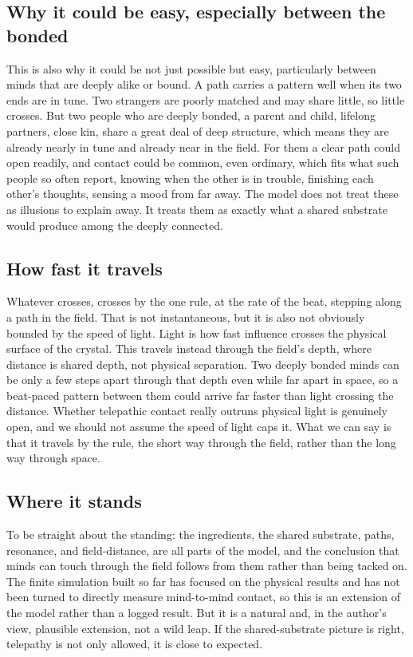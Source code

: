 \subsection{Why it could be easy, especially between the bonded}

This is also why it could be not just possible but easy, particularly between minds that are deeply alike or bound. A path carries a pattern well when its two ends are in tune. Two strangers are poorly matched and may share little, so little crosses. But two people who are deeply bonded, a parent and child, lifelong partners, close kin, share a great deal of deep structure, which means they are already nearly in tune and already near in the field. For them a clear path could open readily, and contact could be common, even ordinary, which fits what such people so often report, knowing when the other is in trouble, finishing each other's thoughts, sensing a mood from far away. The model does not treat these as illusions to explain away. It treats them as exactly what a shared substrate would produce among the deeply connected.

\subsection{How fast it travels}

Whatever crosses, crosses by the one rule, at the rate of the beat, stepping along a path in the field. That is not instantaneous, but it is also not obviously bounded by the speed of light. Light is how fast influence crosses the physical surface of the crystal. This travels instead through the field's depth, where distance is shared depth, not physical separation. Two deeply bonded minds can be only a few steps apart through that depth even while far apart in space, so a beat-paced pattern between them could arrive far faster than light crossing the distance. Whether telepathic contact really outruns physical light is genuinely open, and we should not assume the speed of light caps it. What we can say is that it travels by the rule, the short way through the field, rather than the long way through space.

\subsection{Where it stands}

To be straight about the standing: the ingredients, the shared substrate, paths, resonance, and field-distance, are all parts of the model, and the conclusion that minds can touch through the field follows from them rather than being tacked on. The finite simulation built so far has focused on the physical results and has not been turned to directly measure mind-to-mind contact, so this is an extension of the model rather than a logged result. But it is a natural and, in the author's view, plausible extension, not a wild leap. If the shared-substrate picture is right, telepathy is not only allowed, it is close to expected.

